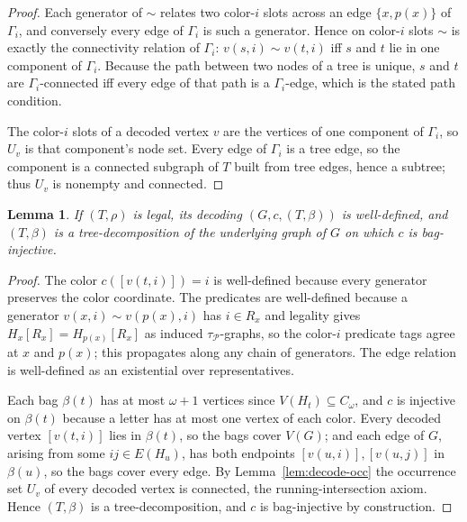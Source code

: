 \documentclass[11pt]{article}
\newtheorem{lemma}[theorem]{Lemma}
\theoremstyle{definition}
\newcommand{\Pred}{\mathcal P}
\begin{document}
\begin{proof}
Each generator of \(\sim\) relates two color-\(i\) slots across an edge
\(\{x,p(x)\}\) of \(\Gamma_i\), and conversely every edge of \(\Gamma_i\) is such a
generator.  Hence on color-\(i\) slots \(\sim\) is exactly the connectivity
relation of \(\Gamma_i\): \(v(s,i)\sim v(t,i)\) iff \(s\) and \(t\) lie in one
component of \(\Gamma_i\).  Because the path between two nodes of a tree is unique,
\(s\) and \(t\) are \(\Gamma_i\)-connected iff every edge of that path is a
\(\Gamma_i\)-edge, which is the stated path condition.

The color-\(i\) slots of a decoded vertex \(v\) are the vertices of one component
of \(\Gamma_i\), so \(U_v\) is that component's node set.  Every edge of
\(\Gamma_i\) is a tree edge, so the component is a connected subgraph of \(T\) built
from tree edges, hence a subtree; thus \(U_v\) is nonempty and connected.
\end{proof}

\begin{lemma}\label{lem:decode-wd}
If \((T,\rho)\) is legal, its decoding \((G,c,(T,\beta))\) is well-defined, and
\((T,\beta)\) is a tree-decomposition of the underlying graph of \(G\) on which
\(c\) is bag-injective.
\end{lemma}

\begin{proof}
The color \(c([v(t,i)])=i\) is well-defined because every generator preserves the
color coordinate.  The predicates are well-defined because a generator
\(v(x,i)\sim v(p(x),i)\) has \(i\in R_x\) and legality gives
\(H_x[R_x]=H_{p(x)}[R_x]\) as induced \(\tau_{\Pred}\)-graphs, so the color-\(i\)
predicate tags agree at \(x\) and \(p(x)\); this propagates along any chain of
generators.  The edge relation is well-defined as an existential over
representatives.

Each bag \(\beta(t)\) has at most \(\omega+1\) vertices since
\(V(H_t)\subseteq C_\omega\), and \(c\) is injective on \(\beta(t)\) because a
letter has at most one vertex of each color.  Every decoded vertex \([v(t,i)]\)
lies in \(\beta(t)\), so the bags cover \(V(G)\); and each edge of \(G\), arising
from some \(ij\in E(H_u)\), has both endpoints \([v(u,i)],[v(u,j)]\) in
\(\beta(u)\), so the bags cover every edge.  By Lemma~\ref{lem:decode-occ} the
occurrence set \(U_v\) of every decoded vertex is connected, the
running-intersection axiom.  Hence \((T,\beta)\) is a tree-decomposition, and \(c\)
is bag-injective by construction.
\end{proof}
\end{document}
